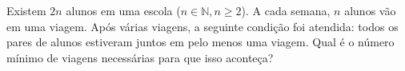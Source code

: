 Existem \(2n\) alunos em uma escola (\(n \in \mathbb{N}, n \geqslant 2\)). A cada semana, \(n\) alunos vão em uma viagem. Após várias viagens, a seguinte condição foi atendida: todos os pares de alunos estiveram juntos em pelo menos uma viagem. Qual é o número mínimo de viagens necessárias para que isso aconteça?

